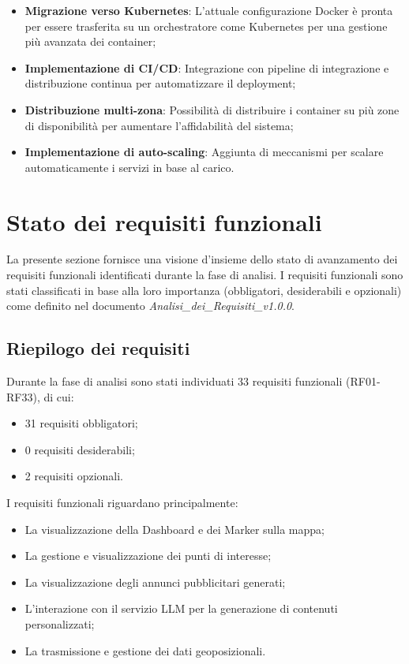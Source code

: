 \documentclass[10pt]{article}
\begin{document}
\begin{itemize}
    \item \textbf{Migrazione verso Kubernetes}: L'attuale configurazione Docker è pronta per essere trasferita su un orchestratore come Kubernetes per una gestione più avanzata dei container;
    \item \textbf{Implementazione di CI/CD}: Integrazione con pipeline di integrazione e distribuzione continua per automatizzare il deployment;
    \item \textbf{Distribuzione multi-zona}: Possibilità di distribuire i container su più zone di disponibilità per aumentare l'affidabilità del sistema;
    \item \textbf{Implementazione di auto-scaling}: Aggiunta di meccanismi per scalare automaticamente i servizi in base al carico.
\end{itemize}

\newpage

\section{Stato dei requisiti funzionali}

La presente sezione fornisce una visione d'insieme dello stato di avanzamento dei requisiti funzionali identificati durante la fase di analisi. I requisiti funzionali sono stati classificati in base alla loro importanza (obbligatori, desiderabili e opzionali) come definito nel documento \textit{Analisi\_dei\_Requisiti\_v1.0.0}.

\subsection{Riepilogo dei requisiti}
Durante la fase di analisi sono stati individuati 33 requisiti funzionali (RF01-RF33), di cui:
\begin{itemize}
    \item 31 requisiti obbligatori;
    \item 0 requisiti desiderabili;
    \item 2 requisiti opzionali.
\end{itemize}

I requisiti funzionali riguardano principalmente:
\begin{itemize}
    \item La visualizzazione della Dashboard e dei Marker sulla mappa;
    \item La gestione e visualizzazione dei punti di interesse;
    \item La visualizzazione degli annunci pubblicitari generati;
    \item L'interazione con il servizio LLM per la generazione di contenuti personalizzati;
    \item La trasmissione e gestione dei dati geoposizionali.
\end{itemize}
\end{document}
